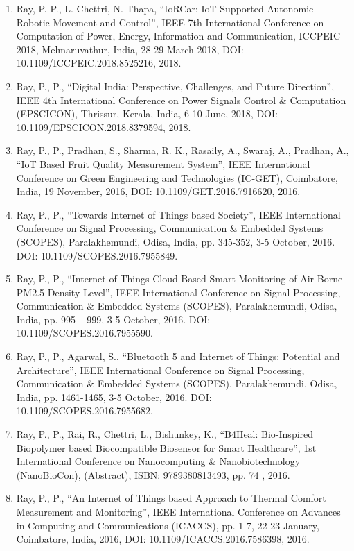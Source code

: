 \documentclass[11pt,a4paper]{moderncv}
\begin{document}
\begin{adjustwidth}{6em}{0pt}
\begin{enumerate}
	\item Ray, P. P., L. Chettri, N. Thapa, “IoRCar: IoT Supported Autonomic Robotic Movement and Control”, IEEE 7th International Conference on Computation of Power, Energy, Information and Communication, ICCPEIC-2018, Melmaruvathur, India, 28-29 March 2018, DOI: 10.1109/ICCPEIC.2018.8525216, 2018. 
	
	\item Ray, P., P., “Digital India: Perspective, Challenges, and Future Direction”, IEEE 4th International Conference on Power Signals Control \& Computation (EPSCICON), Thrissur, Kerala, India, 6-10 June, 2018, DOI: 10.1109/EPSCICON.2018.8379594, 2018.
	
	\item Ray, P., P., Pradhan, S., Sharma, R. K., Rasaily, A., Swaraj, A., Pradhan, A., “IoT Based Fruit Quality Measurement System”, IEEE International Conference on Green Engineering and Technologies (IC-GET), Coimbatore, India, 19 November, 2016, DOI: 10.1109/GET.2016.7916620, 2016.
	
	\item Ray, P., P., “Towards Internet of Things based Society”, IEEE International Conference on Signal Processing, Communication \& Embedded Systems (SCOPES), Paralakhemundi, Odisa, India, pp. 345-352, 3-5 October, 2016. DOI: 10.1109/SCOPES.2016.7955849.
	
	\item Ray, P., P., “Internet of Things Cloud Based Smart Monitoring of Air Borne PM2.5 Density Level”, IEEE International Conference on Signal Processing, Communication \& Embedded Systems (SCOPES), Paralakhemundi, Odisa, India, pp. 995 – 999, 3-5 October, 2016. DOI: 10.1109/SCOPES.2016.7955590.
	
	\item Ray, P., P., Agarwal, S., “Bluetooth 5 and Internet of Things: Potential and Architecture”, IEEE International Conference on Signal Processing, Communication \& Embedded Systems (SCOPES), Paralakhemundi, Odisa, India, pp. 1461-1465, 3-5 October, 2016. DOI: 10.1109/SCOPES.2016.7955682.
	
	\item Ray, P., P., Rai, R., Chettri, L., Bishunkey, K., “B4Heal: Bio-Inspired Biopolymer based Biocompatible Biosensor for Smart Healthcare”, 1st International Conference on Nanocomputing \& Nanobiotechnology (NanoBioCon), (Abstract), ISBN: 9789380813493, pp. 74 , 2016.
	
	\item Ray, P., P., “An Internet of Things based Approach to Thermal Comfort Measurement and Monitoring”, IEEE International Conference on Advances in Computing and Communications (ICACCS), pp. 1-7, 22-23 January, Coimbatore, India, 2016, DOI: 10.1109/ICACCS.2016.7586398, 2016.
	

\end{enumerate}
\end{adjustwidth}
\end{document}
